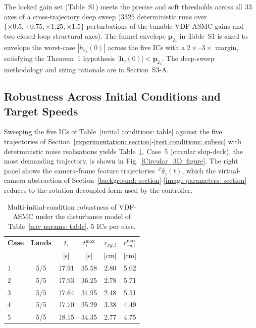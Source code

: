 The locked gain set (Table~S1) meets the precise and soft thresholds across all 33 axes of a cross-trajectory deep sweep ($3325$ deterministic runs over $\{\times 0.5,\times 0.75,\times 1.25,\times 1.5\}$ perturbations of the tunable VDF-ASMC gains and two closed-loop structural axes). The funnel envelope $\boldsymbol{p}_{2_0}$ in Table~S1 is sized to envelope the worst-case $|h_{\text{e}_k}(0)|$ across the five ICs with a $2\times$--$3\times$ margin, satisfying the Theorem~1 hypothesis $|\boldsymbol{h}_\text{e}(0)|<\boldsymbol{p}_{2_0}$. The deep-sweep methodology and sizing rationale are in Section~S3-A.

\subsection{Robustness Across Initial Conditions and Target Speeds}
\label{multi init: subsec}
Sweeping the five ICs of Table~\ref{initial conditions: table} against the five trajectories of Section~\ref{experimentation: section}-\ref{test conditions: subsec} with deterministic noise realisations yields Table~\ref{multi init: table}. Case~5 (circular ship-deck), the most demanding trajectory, is shown in Fig.~\ref{Circular_3D: figure}. The right panel shows the camera-frame feature trajectories $\,^\mathcal{C}\hat{\boldsymbol{r}}_i(t)$, which the virtual-camera abstraction of Section~\ref{background: section}-\ref{image parameters: section} reduces to the rotation-decoupled form used by the controller.

\begin{table}[!t]
\centering
\caption{Multi-initial-condition robustness of VDF-ASMC under the disturbance model of Table~\ref{uav params: table}, 5 ICs per case.}
\label{multi init: table}
\begin{tabular}{lccccc}
\toprule
\textbf{Case} & \textbf{Lands} & $\bar{t}_\text{f}$ & $t_\text{f}^{\max}$ & $\bar{r}_{xy,\text{f}}$ & $r_{xy,\text{f}}^{\max}$ \\
              &                & [s]                & [s]                 & [cm]                     & [cm] \\
\midrule
1      & 5/5 & 17.91 & 35.58 & 2.80 & 5.02 \\
2      & 5/5 & 17.93 & 36.25 & 2.78 & 5.71 \\
3      & 5/5 & 17.64 & 34.95 & 2.48 & 5.51 \\
4      & 5/5 & 17.70 & 35.29 & 3.38 & 4.49 \\
5      & 5/5 & 18.15 & 34.35 & 2.77 & 4.75 \\
\bottomrule
\end{tabular}
\end{table}

